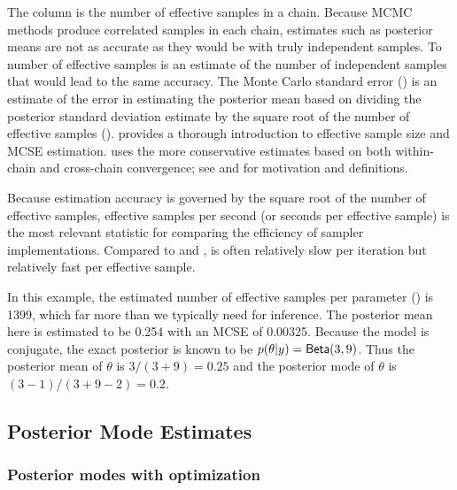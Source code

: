 \documentclass[article]{jss}
\begin{document}
The column  is the number of effective samples in a
chain.  Because MCMC methods produce correlated samples in each chain,
estimates such as posterior means are not as accurate as they would be
with truly independent samples.  To number of effective samples is an
estimate of the number of independent samples that would lead to the
same accuracy.  The Monte Carlo standard error () is an
estimate of the error in estimating the posterior mean based on
dividing the posterior standard deviation estimate by the square root
of the number of effective samples ().
\cite{Geyer:2011} provides a thorough introduction to effective sample
size and MCSE estimation.   uses the more conservative
estimates based on both within-chain and cross-chain convergence; see
\citep{GelmanEtAl:2013} and \citep{Stan:2013} for motivation and
definitions.

Because estimation accuracy is governed by the square root of the
number of effective samples, effective samples per second (or seconds
per effective sample) is the most relevant statistic for comparing the
efficiency of sampler implementations.  Compared to 
and ,  is often relatively slow per
iteration but relatively fast per effective sample.

In this example, the estimated number of effective samples per
parameter () is 1399, which far more than we typically
need for inference.  The posterior mean here is estimated to be 0.254
with an MCSE of 0.00325.  Because the model is conjugate, the exact
posterior is known to be $p(\theta|y) = \mbox{\sf Beta}(3,9)$.  Thus
the posterior mean of $\theta$ is $3/(3+9) = 0.25$ and the posterior
mode of $\theta$ is $(3-1)/(3 + 9 - 2) = 0.2$.


\subsection{Posterior Mode Estimates}

\subsubsection{Posterior modes with optimization}
\end{document}
